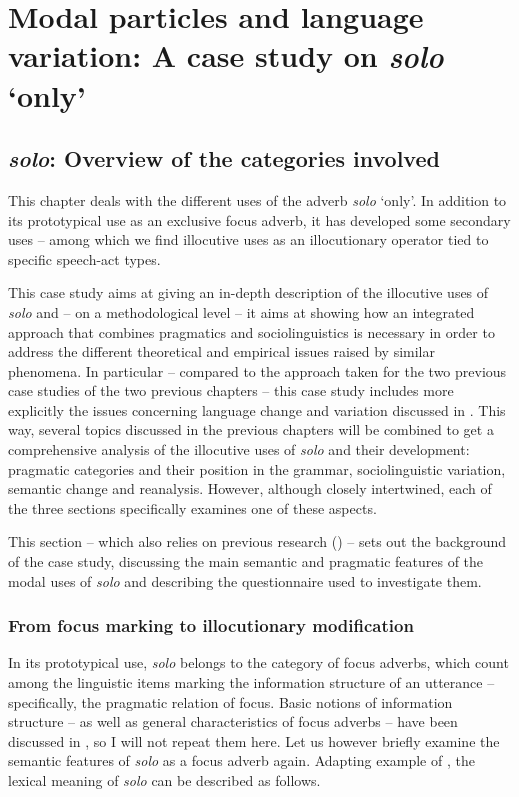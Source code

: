 \chapter{Modal particles and language variation: A case study on \textit{solo} ‘only’}\label{sec:8}
\hypertarget{Toc124860667}{}\section{\textit{solo}: Overview of the categories involved}
\hypertarget{Toc124860668}{}
This chapter deals with the different uses of the adverb \textit{solo} ‘only’. In addition to its prototypical use as an exclusive focus adverb, it has developed some secondary uses – among which we find illocutive uses as an illocutionary operator tied to specific speech-act types.

This case study aims at giving an in-depth description of the illocutive uses of \textit{solo} and – on a methodological level – it aims at showing how an integrated approach that combines pragmatics and sociolinguistics is necessary in order to address the different theoretical and empirical issues raised by similar phenomena. In particular – compared to the approach taken for the two previous case studies of the two previous chapters – this case study includes more explicitly the issues concerning language change and variation discussed in . This way, several topics discussed in the previous chapters will be combined to get a comprehensive analysis of the illocutive uses of \textit{solo} and their development: pragmatic categories and their position in the grammar, sociolinguistic variation, semantic change and reanalysis. However, although closely intertwined, each of the three sections specifically examines one of these aspects.

This section – which also relies on previous research (\citealt{Favaro2019,Favaro2020}) – sets out the background of the case study, discussing the main semantic and pragmatic features of the modal uses of \textit{solo} and describing the questionnaire used to investigate them.

\subsection{From focus marking to illocutionary modification}
\hypertarget{Toc124860669}{}
In its prototypical use, \textit{solo} belongs to the category of focus adverbs, which count among the linguistic items marking the information structure of an utterance – specifically, the pragmatic relation of focus. Basic notions of information structure – as well as general characteristics of focus adverbs – have been discussed in , so I will not repeat them here. Let us however briefly examine the semantic features of \textit{solo} as a focus adverb again. Adapting example  of , the lexical meaning of \textit{solo} can be described as follows.

